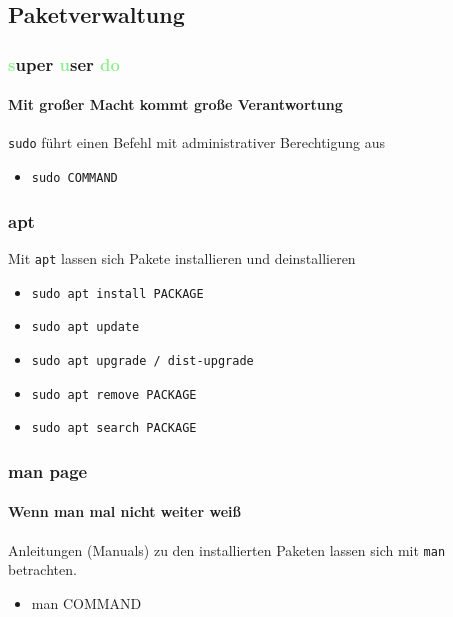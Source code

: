 \documentclass[12pt,utf8]{beamer}
\begin{document}

\subsection{Paketverwaltung}
\begin{frame}
	\frametitle{\textcolor{lightGreen}{s}uper \textcolor{lightGreen}{u}ser \textcolor{lightGreen}{do}}
	\framesubtitle{Mit großer Macht kommt große Verantwortung}
	\texttt{sudo} führt einen Befehl mit administrativer Berechtigung aus
	\begin{itemize}
		\item \texttt{sudo COMMAND}
	\end{itemize}
\end{frame}

\begin{frame}
	\frametitle{apt}
	Mit \texttt{apt} lassen sich Pakete installieren und deinstallieren
	\begin{itemize}
		\item \texttt{sudo apt install PACKAGE}
		\item \texttt{sudo apt update}
		\item \texttt{sudo apt upgrade / dist-upgrade}
		\item \texttt{sudo apt remove PACKAGE}
		\item \texttt{sudo apt search PACKAGE}
	\end{itemize}
\end{frame}

\begin{frame}
	\frametitle{man page}
	\framesubtitle{Wenn man mal nicht weiter weiß}
	Anleitungen (Manuals) zu den installierten Paketen lassen sich mit \texttt{man} betrachten.
	\begin{itemize}
		\item man COMMAND
	\end{itemize}
\end{frame}
\end{document}
